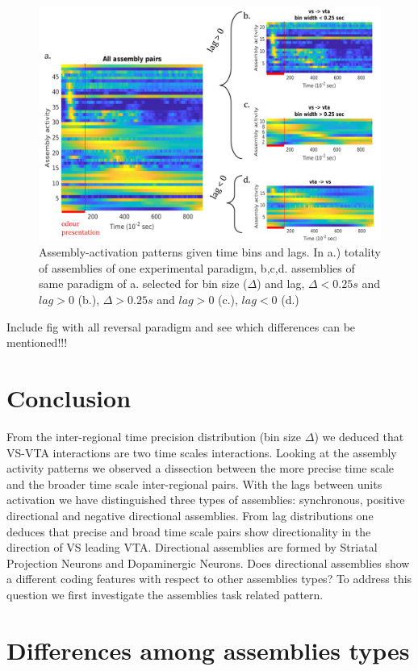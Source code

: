 \begin{figure}
    \centering
    \includegraphics[scale=0.45]{figures/AsActPerBinLag1.png}
    \caption{Assembly-activation patterns given time bins and lags. In a.) totality of assemblies of one experimental paradigm, b,c,d. assemblies of same paradigm of a. selected for bin size ($\Delta$) and lag, $\Delta < 0.25 s$ and $lag > 0$ (b.), $\Delta > 0.25 s$ and $lag > 0$ (c.), $lag < 0$ (d.)}
    \label{fig:AsActBinLag}
\end{figure}
{\color{red}Include fig with all reversal paradigm and see which differences can be mentioned!!!}
\section{Conclusion}
From the inter-regional time precision distribution (bin size $\Delta$) we deduced that VS-VTA interactions are two time scales interactions. Looking at the assembly activity patterns we observed a dissection between the more precise time scale and the broader time scale inter-regional pairs. 
With the lags between units activation we have distinguished three types of assemblies: synchronous, positive directional and negative directional assemblies. From lag distributions one deduces that precise and broad time scale pairs show directionality in the direction of VS leading VTA.
Directional assemblies are formed by Striatal Projection Neurons and Dopaminergic Neurons.
Does directional assemblies show a different coding features with respect to other assemblies types?
To address this question we first investigate the assemblies task related pattern.
  
 \section{Differences among assemblies types}
 
